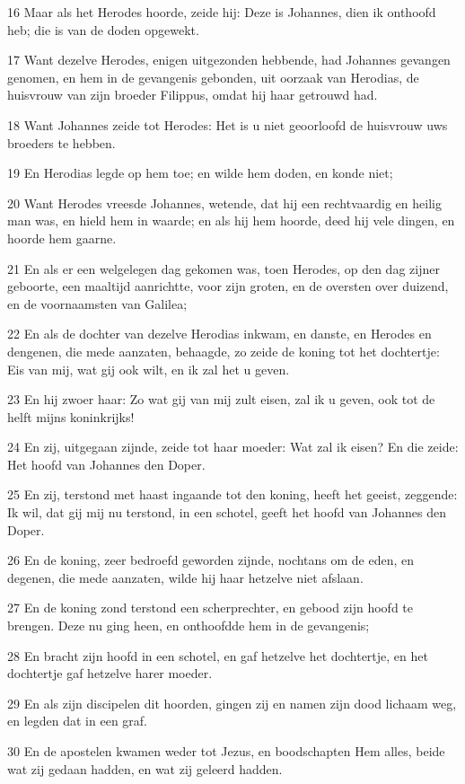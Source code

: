\par 16 Maar als het Herodes hoorde, zeide hij: Deze is Johannes, dien ik onthoofd heb; die is van de doden opgewekt.
\par 17 Want dezelve Herodes, enigen uitgezonden hebbende, had Johannes gevangen genomen, en hem in de gevangenis gebonden, uit oorzaak van Herodias, de huisvrouw van zijn broeder Filippus, omdat hij haar getrouwd had.
\par 18 Want Johannes zeide tot Herodes: Het is u niet geoorloofd de huisvrouw uws broeders te hebben.
\par 19 En Herodias legde op hem toe; en wilde hem doden, en konde niet;
\par 20 Want Herodes vreesde Johannes, wetende, dat hij een rechtvaardig en heilig man was, en hield hem in waarde; en als hij hem hoorde, deed hij vele dingen, en hoorde hem gaarne.
\par 21 En als er een welgelegen dag gekomen was, toen Herodes, op den dag zijner geboorte, een maaltijd aanrichtte, voor zijn groten, en de oversten over duizend, en de voornaamsten van Galilea;
\par 22 En als de dochter van dezelve Herodias inkwam, en danste, en Herodes en dengenen, die mede aanzaten, behaagde, zo zeide de koning tot het dochtertje: Eis van mij, wat gij ook wilt, en ik zal het u geven.
\par 23 En hij zwoer haar: Zo wat gij van mij zult eisen, zal ik u geven, ook tot de helft mijns koninkrijks!
\par 24 En zij, uitgegaan zijnde, zeide tot haar moeder: Wat zal ik eisen? En die zeide: Het hoofd van Johannes den Doper.
\par 25 En zij, terstond met haast ingaande tot den koning, heeft het geeist, zeggende: Ik wil, dat gij mij nu terstond, in een schotel, geeft het hoofd van Johannes den Doper.
\par 26 En de koning, zeer bedroefd geworden zijnde, nochtans om de eden, en degenen, die mede aanzaten, wilde hij haar hetzelve niet afslaan.
\par 27 En de koning zond terstond een scherprechter, en gebood zijn hoofd te brengen. Deze nu ging heen, en onthoofdde hem in de gevangenis;
\par 28 En bracht zijn hoofd in een schotel, en gaf hetzelve het dochtertje, en het dochtertje gaf hetzelve harer moeder.
\par 29 En als zijn discipelen dit hoorden, gingen zij en namen zijn dood lichaam weg, en legden dat in een graf.
\par 30 En de apostelen kwamen weder tot Jezus, en boodschapten Hem alles, beide wat zij gedaan hadden, en wat zij geleerd hadden.
